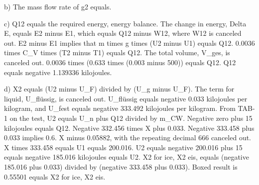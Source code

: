 b) The mass flow rate of g2 equals.

c) Q12 equals the required energy, energy balance. The change in energy, Delta E, equals E2 minus E1, which equals Q12 minus W12, where W12 is canceled out. E2 minus E1 implies that m times g times (U2 minus U1) equals Q12. 0.0036 times C_V times (T2 minus T1) equals Q12. The total volume, V_ges, is canceled out. 0.0036 times (0.633 times (0.003 minus 500)) equals Q12. Q12 equals negative 1.139336 kilojoules.

d) X2 equals (U2 minus U_F) divided by (U_g minus U_F). The term for liquid, U_flüssig, is canceled out. U_flüssig equals negative 0.033 kilojoules per kilogram, and U_fest equals negative 333.492 kilojoules per kilogram. From TAB-1 on the test, U2 equals U_n plus Q12 divided by m_CW. Negative zero plus 15 kilojoules equals Q12. Negative 332.456 times X plus 0.033. Negative 333.458 plus 0.033 implies 0.6. X minus 0.05882, with the repeating decimal 666 canceled out. X times 333.458 equals U1 equals 200.016. U2 equals negative 200.016 plus 15 equals negative 185.016 kilojoules equals U2. X2 for ice, X2 eis, equals (negative 185.016 plus 0.033) divided by (negative 333.458 plus 0.033). Boxed result is 0.55501 equals X2 for ice, X2 eis.